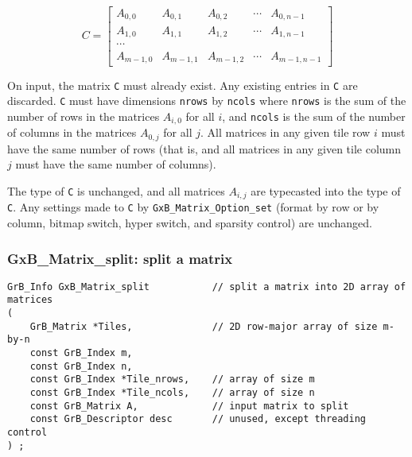 \documentclass[12pt]{article}
\begin{document}
\[
C = 
\left[
\begin{array}{ccccc}
          A_{0,0}   & A_{0,1}   & A_{0,2}   & \cdots & A_{0,n-1}   \\
          A_{1,0}   & A_{1,1}   & A_{1,2}   & \cdots & A_{1,n-1}   \\
          \cdots    &                                              \\
          A_{m-1,0} & A_{m-1,1} & A_{m-1,2} & \cdots & A_{m-1,n-1}
\end{array}
\right]
\]

On input, the matrix \verb'C' must already exist.  Any existing entries in
\verb'C' are discarded.  \verb'C' must have dimensions \verb'nrows' by
\verb'ncols' where \verb'nrows' is the sum of the number of rows in the
matrices $A_{i,0}$ for all $i$, and \verb'ncols' is the sum of the number of
columns in the matrices $A_{0,j}$ for all $j$.  All matrices in any given tile
row $i$ must have the same number of rows (that is, and all matrices in any
given tile column $j$ must have the same number of columns).

The type of \verb'C' is unchanged, and all matrices $A_{i,j}$ are typecasted
into the type of \verb'C'.  Any settings made to \verb'C' by
\verb'GxB_Matrix_Option_set' (format by row or by column, bitmap switch, hyper
switch, and sparsity control) are unchanged.

\subsubsection{{\sf GxB\_Matrix\_split:} split a matrix   }
\label{matrix_split}

\begin{mdframed}[userdefinedwidth=6in]
{\footnotesize
\begin{verbatim}
GrB_Info GxB_Matrix_split           // split a matrix into 2D array of matrices
(
    GrB_Matrix *Tiles,              // 2D row-major array of size m-by-n
    const GrB_Index m,
    const GrB_Index n,
    const GrB_Index *Tile_nrows,    // array of size m
    const GrB_Index *Tile_ncols,    // array of size n
    const GrB_Matrix A,             // input matrix to split
    const GrB_Descriptor desc       // unused, except threading control
) ;
\end{verbatim} } \end{mdframed}
\end{document}
